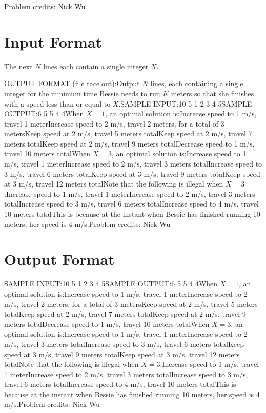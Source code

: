 \documentclass[12pt]{article}
\begin{document}
Problem credits: Nick Wu



\section*{Input Format}
The next $N$ lines each contain a single integer $X$.

OUTPUT FORMAT (file race.out):Output $N$ lines, each containing a single integer for the minimum
time Bessie needs to run $K$ meters so that she finishes with a speed
less than or equal to $X$.SAMPLE INPUT:10 5
1
2
3
4
5SAMPLE OUTPUT:6
5
5
4
4When $X = 1$, an optimal solution is:Increase speed to 1 m/s, travel 1 meterIncrease speed to 2 m/s,
travel 2 meters, for a total of 3 metersKeep speed at 2 m/s, travel
5 meters totalKeep speed at 2 m/s, travel 7 meters totalKeep speed at 2 m/s, travel 9 meters totalDecrease speed to 1 m/s,
travel 10 meters totalWhen $X = 3$, an optimal solution is:Increase speed to 1 m/s, travel 1 meterIncrease speed to 2 m/s,
travel 3 meters totalIncrease speed to 3 m/s, travel 6 meters totalKeep speed at 3 m/s, travel 9 meters totalKeep speed at 3
m/s, travel 12 meters totalNote that the following is illegal when $X = 3$:Increase speed to 1 m/s, travel 1 meterIncrease speed to 2 m/s,
travel 3 meters totalIncrease speed to 3 m/s, travel 6 meters totalIncrease speed to 4 m/s, travel 10 meters totalThis is because at the instant when Bessie has finished running 10 meters, her
speed is 4 m/s.Problem credits: Nick Wu

\section*{Output Format}
SAMPLE INPUT:10 5
1
2
3
4
5SAMPLE OUTPUT:6
5
5
4
4When $X = 1$, an optimal solution is:Increase speed to 1 m/s, travel 1 meterIncrease speed to 2 m/s,
travel 2 meters, for a total of 3 metersKeep speed at 2 m/s, travel
5 meters totalKeep speed at 2 m/s, travel 7 meters totalKeep speed at 2 m/s, travel 9 meters totalDecrease speed to 1 m/s,
travel 10 meters totalWhen $X = 3$, an optimal solution is:Increase speed to 1 m/s, travel 1 meterIncrease speed to 2 m/s,
travel 3 meters totalIncrease speed to 3 m/s, travel 6 meters totalKeep speed at 3 m/s, travel 9 meters totalKeep speed at 3
m/s, travel 12 meters totalNote that the following is illegal when $X = 3$:Increase speed to 1 m/s, travel 1 meterIncrease speed to 2 m/s,
travel 3 meters totalIncrease speed to 3 m/s, travel 6 meters totalIncrease speed to 4 m/s, travel 10 meters totalThis is because at the instant when Bessie has finished running 10 meters, her
speed is 4 m/s.Problem credits: Nick Wu
\end{document}

